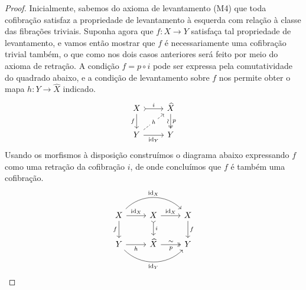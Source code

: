\begin{proof}
  Inicialmente, sabemos do axioma de levantamento (M4) que toda cofibração satisfaz a propriedade de levantamento à esquerda com relação à classe das fibrações triviais.
  Suponha agora que $f: X \to Y$ satisfaça tal propriedade de levantamento, e vamos então mostrar que $f$ é necessariamente uma cofibração trivial também, o que como nos dois casos anteriores será feito por meio do axioma de retração.
  A condição $f = p \circ i$ pode ser expressa pela comutatividade do quadrado abaixo, e a condição de levantamento sobre $f$ nos permite obter o mapa $h: Y \to \widehat{X}$ indicado.
  \begin{displaymath}
    \begin{tikzcd}
      X
      \arrow[r, tail, "i"]
      \arrow[d, "f" swap]
      & \widehat{X}
      \arrow[d, two heads, "p", "\sim" {swap, sloped}]
      \\ Y
      \arrow[r, "\id_{Y}" swap]
      \arrow[ru, dashed, "h" description]
      & Y
    \end{tikzcd}
  \end{displaymath}
  Usando os morfismos à disposição construímos o diagrama abaixo expressando $f$ como uma retração da cofibração $i$, de onde concluímos que $f$ é também uma cofibração.
  \begin{displaymath}
    \begin{tikzcd}
      X
      \arrow[r, "\id_{X}"]
      \arrow[d, "f" swap]
      \arrow[rr, bend left=45, "\id_{X}"]
      & X
      \arrow[r, "\id_{X}"]
      \arrow[d, tail, "i"]
      & X
      \arrow[d, "f"]
      \\ Y
      \arrow[r, "h" swap]
      \arrow[rr, bend right=45, "\id_{Y}" swap]
      & \widehat{X}
      \arrow[r, two heads, "p" {swap}, "\sim"]
      & Y
    \end{tikzcd}
  \end{displaymath}


\end{proof}
